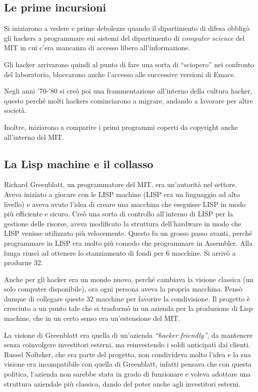 \subsection{Le prime incursioni}

Si iniziarono a vedere e prime debolezze quando il dipartimento di difesa obbligò gli hackers a programmare sui sistemi del dipartimento di \textit{computer science} del MIT in cui c'era mancanza di accesso libero all'informazione. 

Gli hacker arrivarono quindi al punto di fare una sorta di ``sciopero'' nei confronto del laboratorio, bloccarono anche l'accesso alle successive versioni di Emacs. 

Negli anni '70-'80 si creò poi una frammentazione all'interno della cultura hacker, questo perché molti hackers cominciarono a migrare, andando a lavorare per altre società.

Inoltre, iniziarono a comparire i primi programmi coperti da copyright anche all'interno del MIT.

\subsection{La Lisp machine e il collasso}

Richard Greenblatt, un programmatore del MIT, era un'autorità nel settore. 
Aveva iniziato a giocare con le LISP machine (LISP era un linguaggio ad alto livello) e aveva avuto l'idea di creare una macchina che eseguisse LISP in modo più efficiente e sicuro. 
Creò una sorta di controllo all'interno di LISP per la gestione delle risorse, aveva modificato la struttura dell'hardware in modo che LISP venisse utilizzato più velocemente. 
Questo fu un grosso passo avanti, perché programmare in LISP era molto più comodo che programmare in Assembler. 
Alla lunga riuscì ad ottenere lo stanziamento di fondi per 6 macchine. Si arrivò a produrne 32. 

Anche per gli hacker era un mondo nuovo, perché cambiava la visione classica (un solo computer disponibile), ora ogni persona aveva la propria macchina. Pensò dunque di collegare queste 32 macchine per favorire la condivisione. 
Il progetto è cresciuto a un punto tale che si trasformò in un azienda per la produzione di Lisp machine, che in un certo senso era un'estensione del MIT. 

La visione di Greenblatt era quella di un'azienda \textit{``hacker friendly''}, da mantenere senza coinvolgere investitori esterni, ma reinvestendo i soldi anticipati dai clienti. 
Russel Noftsker, che era parte del progetto, non condivideva molto l'idea e la sua visione era incompatibile con quella di Greenblatt, infatti pensava che con questa politica, l'azienda non sarebbe stata in grado di funzionare e voleva adottare una struttura aziendale più classica, dando del poter anche agli investitori esterni.

